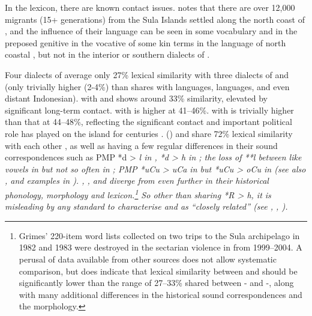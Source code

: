 In the lexicon, there are known contact issues.
\citet{Grimes1991c,Grimes2000a} notes that there are over 12,000 migrants
(15+ generations) from the Sula Islands settled along the north
coast of , and the influence of their language can be seen in some vocabulary
and in the preposed genitive in the vocative of some kin terms
in the  language of north coastal ,
but not in the interior or southern dialects of .

Four dialects of  average only 27{\%} lexical similarity
with three dialects of 
and  (only trivially higher (2-4{\%}) than  shares
with  languages, 
languages, and even distant Indonesian).
 with  and  shows around 33{\%} similarity,
elevated by significant long-term contact.
 with  is higher at 41--46{\%}.
 with  is trivially higher than that at 44--48{\%},
reflecting the significant contact
and important political role  has played
on the island for centuries \citep{Grimes2000a}.
 () and  share 72{\%} lexical similarity with
each other \citep{GrimesGrimes1994},
as well as having a few regular differences in their sound correspondences
such as PMP *d > \it{l} in ,
*d > \it{h} in ; the loss of **l between like vowels in
 but not so often in ; PMP *uCu > \it{uCa} in 
but *uCu > \it{oCu} in  (see also \citet{Bloyd2015,Bloyd2020},
and examples in ).
, , and  diverge from  even further in their
historical phonology, morphology and lexicon.\footnote{
		Grimes’ 220-item word lists collected
		on two trips to the Sula archipelago in 1982
		and 1983 were destroyed in the sectarian violence in  from 1999--2004.
		A perusal of data available from other sources
		\citep{Collins1981,Collins1989,Blust1981,Stokhof1980b}
		does not allow systematic comparison,
		but does indicate that lexical similarity between 
		and  should be significantly lower than the range of 27--33{\%}
		shared between - and -,
		along with many additional differences in
		the historical sound correspondences
		and the morphology.}
So other than sharing *R > \it{h}, it
is misleading by any standard to characterise 
and  as “closely related”
(see \cite[31]{Collins1981}, \citeyear[78, 81, 84]{Collins1982c}, \citeyear[48]{Collins1983}).


